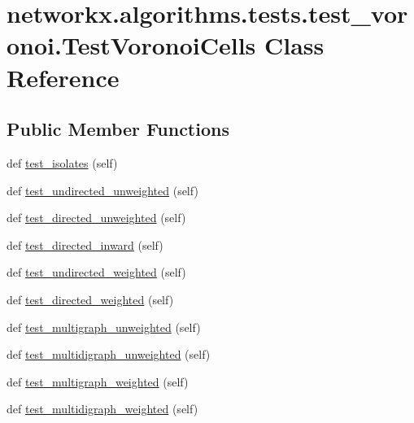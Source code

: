 \hypertarget{classnetworkx_1_1algorithms_1_1tests_1_1test__voronoi_1_1TestVoronoiCells}{}\section{networkx.\+algorithms.\+tests.\+test\+\_\+voronoi.\+Test\+Voronoi\+Cells Class Reference}
\label{classnetworkx_1_1algorithms_1_1tests_1_1test__voronoi_1_1TestVoronoiCells}
\subsection*{Public Member Functions}
\begin{DoxyCompactItemize}
\item 
def \hyperlink{classnetworkx_1_1algorithms_1_1tests_1_1test__voronoi_1_1TestVoronoiCells_a8c9eca42447964235fd82cf6739a7567}{test\+\_\+isolates} (self)
\item 
def \hyperlink{classnetworkx_1_1algorithms_1_1tests_1_1test__voronoi_1_1TestVoronoiCells_adf7f5dcae8ceb98191b6173f4687cedf}{test\+\_\+undirected\+\_\+unweighted} (self)
\item 
def \hyperlink{classnetworkx_1_1algorithms_1_1tests_1_1test__voronoi_1_1TestVoronoiCells_a9047afb9a4e550b1f20aeacf6e2693bb}{test\+\_\+directed\+\_\+unweighted} (self)
\item 
def \hyperlink{classnetworkx_1_1algorithms_1_1tests_1_1test__voronoi_1_1TestVoronoiCells_a927f35009ba00ede8467c1892961f55d}{test\+\_\+directed\+\_\+inward} (self)
\item 
def \hyperlink{classnetworkx_1_1algorithms_1_1tests_1_1test__voronoi_1_1TestVoronoiCells_aae11f1f59b3446040b559b4556fac946}{test\+\_\+undirected\+\_\+weighted} (self)
\item 
def \hyperlink{classnetworkx_1_1algorithms_1_1tests_1_1test__voronoi_1_1TestVoronoiCells_a7f2d1cf298a4d37f8824f4dc6b49a593}{test\+\_\+directed\+\_\+weighted} (self)
\item 
def \hyperlink{classnetworkx_1_1algorithms_1_1tests_1_1test__voronoi_1_1TestVoronoiCells_a99deeab488a472b5a1b7a7a04c6aae35}{test\+\_\+multigraph\+\_\+unweighted} (self)
\item 
def \hyperlink{classnetworkx_1_1algorithms_1_1tests_1_1test__voronoi_1_1TestVoronoiCells_ab19d1907dac724a94e4d70bb25293be5}{test\+\_\+multidigraph\+\_\+unweighted} (self)
\item 
def \hyperlink{classnetworkx_1_1algorithms_1_1tests_1_1test__voronoi_1_1TestVoronoiCells_a16dfa1089c5115a8a9c69638a65f077b}{test\+\_\+multigraph\+\_\+weighted} (self)
\item 
def \hyperlink{classnetworkx_1_1algorithms_1_1tests_1_1test__voronoi_1_1TestVoronoiCells_aa8c13861005e921075be5867c6da1bd9}{test\+\_\+multidigraph\+\_\+weighted} (self)
\end{DoxyCompactItemize}



